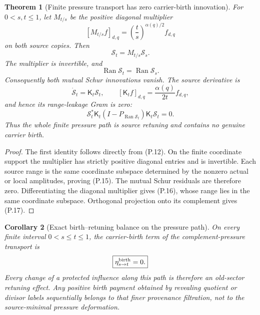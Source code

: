 \documentclass[11pt]{article}
\newtheorem{theorem}{Theorem}[section]
\newtheorem{corollary}[theorem]{Corollary}
\theoremstyle{definition}
\theoremstyle{remark}
\newcommand{\Ran}{\operatorname{Ran}}
\begin{document}
\begin{theorem}[Finite pressure transport has zero carrier-birth innovation]
\label{thm:affpress-zero-birth}
For $0<s,t\le1$, let $M_{t/s}$ be the positive diagonal multiplier
\[
 [M_{t/s}f]_{d,q}
 =\left(\frac ts\right)^{\alpha(q)/2}f_{d,q}
\]
on both source copies.  Then
\begin{equation}
 \label{eq:affpress-source-transport}
 \boxed{
 \mathscr S_t=M_{t/s}\mathscr S_s.}
 \tag{P.14}
\end{equation}
The multiplier is invertible, and
\begin{equation}
 \label{eq:affpress-source-range}
 \boxed{
 \Ran\mathscr S_t=\Ran\mathscr S_s.}
 \tag{P.15}
\end{equation}
Consequently both mutual Schur innovations vanish.  The source derivative is
\begin{equation}
 \label{eq:affpress-source-derivative}
 \boxed{
 \dot{\mathscr S}_t
 =\mathsf K_t\mathscr S_t,
 \qquad
 [\mathsf K_tf]_{d,q}
 =\frac{\alpha(q)}{2t}f_{d,q},}
 \tag{P.16}
\end{equation}
and hence its range-leakage Gram is zero:
\begin{equation}
 \label{eq:affpress-zero-leakage}
 \boxed{
 \mathscr S_t^*\mathsf K_t
 (I-P_{\Ran\mathscr S_t})
 \mathsf K_t\mathscr S_t=0.}
 \tag{P.17}
\end{equation}
Thus the whole finite pressure path is source retuning and contains no genuine
carrier birth.
\end{theorem}

\begin{proof}
The first identity follows directly from \textup{(P.12)}.  On the finite
coordinate support the multiplier has strictly positive diagonal entries and
is invertible.  Each source range is the same coordinate subspace determined
by the nonzero actual or local amplitudes, proving \textup{(P.15)}.  The
mutual Schur residuals are therefore zero.  Differentiating the diagonal
multiplier gives \textup{(P.16)}, whose range lies in the same coordinate
subspace.  Orthogonal projection onto its complement gives
\textup{(P.17)}.
\end{proof}

\begin{corollary}[Exact birth--retuning balance on the pressure path]
\label{cor:affpress-retuning-only}
On every finite interval $0<s\le t\le1$, the carrier-birth term of the
complement-pressure transport is
\[
 \boxed{\eta_{s\to t}^{\rm birth}=0.}
\]
Every change of a protected influence along this path is therefore an
old-sector retuning effect.  Any positive birth payment obtained by revealing
quotient or divisor labels sequentially belongs to that finer provenance
filtration, not to the source-minimal pressure deformation.
\end{corollary}
\end{document}
